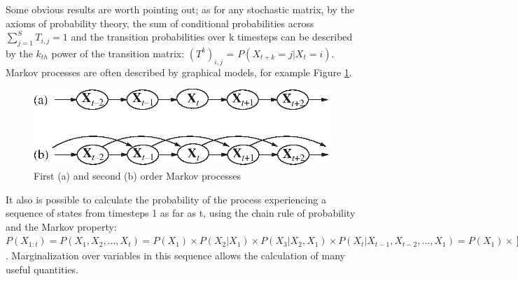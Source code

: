 Some obvious results are worth pointing out; as for any stochastic matrix, by the axioms of probability theory, the sum of conditional probabilities across {$\displaystyle \sum _{j=1}^{S}T_{i,j}=1$} and the transition probabilities over k timesteps can be described by the $k_{th}$ power of the transition matrix: ${(T^k)}_{i,j}$ = $P(X_{t+k} = j | X_{t} = i)$. Markov processes are often described by graphical models, for example Figure \ref{fig:markov-processes}.
\begin{figure}[b]
    \centering
    \includegraphics{Chapters/MultiAgentTargetDetection/BayesianFiltering/Figs/markov-processes.eps}
    \caption{First (a) and second (b) order Markov processes \cite{AIAMA}}
    \label{fig:markov-processes}
\end{figure}
It also is possible to calculate the probability of the process experiencing a sequence of states from timesteps 1 as far as t, using the chain rule of probability and the Markov property:
$P(X_{1:t}) = P(X_1, X_2, ..., X_t) = P(X_1)\times P(X_2 | X_1)\times P(X_3 | X_2, X_1) \times P(X_t | X_{t-1}, X_{t-2}, ... , X_1) = P(X_1) \times \prod_{i=2}^{t}{P(X_i | x_{i-1})}$. Marginalization over variables in this sequence allows the calculation of many useful quantities.
\par

